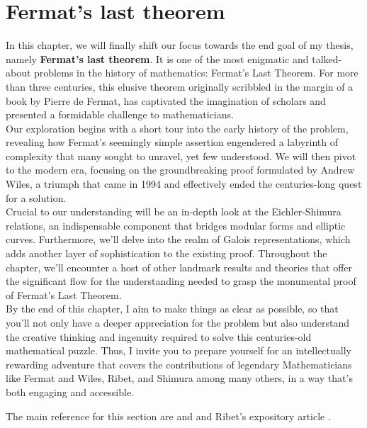 \section{Fermat's last theorem}
In this chapter, we will finally shift our focus towards the end goal of my thesis, namely \textbf{Fermat's last theorem}. It is one of the most enigmatic and talked-about problems in the history of mathematics: Fermat's Last Theorem. For more than three centuries, this elusive theorem originally scribbled in the margin of a book by Pierre de Fermat, has captivated the imagination of scholars and presented a formidable challenge to mathematicians.\\

Our exploration begins with a short tour into the early history of the problem, revealing how Fermat's seemingly simple assertion engendered a labyrinth of complexity that many sought to unravel, yet few understood. We will then pivot to the modern era, focusing on the groundbreaking proof formulated by Andrew Wiles, a triumph that came in 1994 and effectively ended the centuries-long quest for a solution.\\

Crucial to our understanding will be an in-depth look at the Eichler-Shimura relations, an indispensable component that bridges modular forms and elliptic curves. Furthermore, we'll delve into the realm of Galois representations, which adds another layer of sophistication to the existing proof. Throughout the chapter, we'll encounter a host of other landmark results and theories that offer the significant flow for the understanding needed to grasp the monumental proof of Fermat's Last Theorem. \\

By the end of this chapter, I aim to make things as clear as possible, so that you'll not only have a deeper appreciation for the problem but also understand the creative thinking and ingenuity required to solve this centuries-old mathematical puzzle. Thus, I invite you to prepare yourself for an intellectually rewarding adventure that covers the contributions of legendary Mathematicians like Fermat and Wiles, Ribet, and Shimura among many others, in a way that's both engaging and accessible.

The main reference for this section are \cite{darmon1995fermat} and \cite{ribet1990from} and Ribet's expository article \cite{Ribet1990}.  

